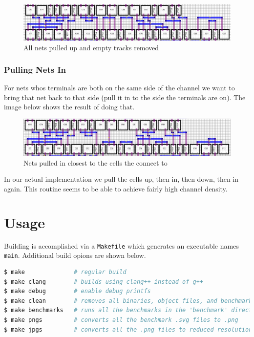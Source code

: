 \documentclass[10pt]{article}
\begin{document}
        \begin{figure}[H]
            \centering
            \includegraphics[width=\linewidth]{./route_4_crop.png}
            \caption{All nets pulled up and empty tracks removed}
        \end{figure}

    \subsubsection{Pulling Nets In}

        For nets whos terminals are both on the same side of the channel we
        want to bring that net back to that side (pull it in to the side the
        terminals are on). The image below shows the result of doing that.

        \begin{figure}[H]
            \centering
            \includegraphics[width=\linewidth]{./route_5_crop.png}
            \caption{Nets pulled in closest to the cells the connect to}
        \end{figure}

        In our actual implementation we pull the cells up, then in, then down,
        then in again. This routine seems to be able to achieve fairly high
        channel density.

\newpage
\section{Usage}

Building is accomplished via a \texttt{Makefile} which generates an executable
names \texttt{main}.  Additional build opions are shown below.

\begin{lstlisting}[language=bash]
$ make              # regular build
$ make clang        # builds using clang++ instead of g++
$ make debug        # enable debug printfs
$ make clean        # removes all binaries, object files, and benchmark results
$ make benchmarks   # runs all the benchmarks in the 'benchmark' directory
$ make pngs         # converts all the benchmark .svg files to .png
$ make jpgs         # converts all the .png files to reduced resolution .jpg files
\end{lstlisting}
\end{document}
